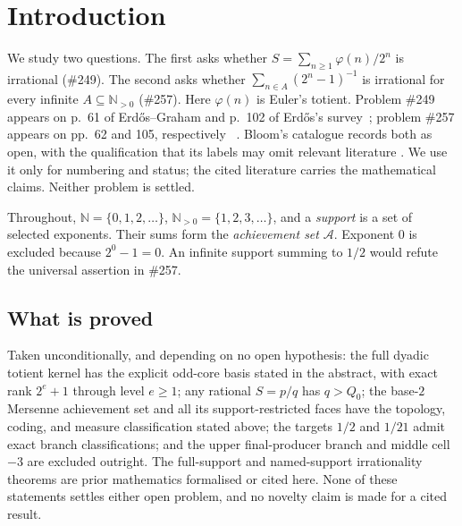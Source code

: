 \documentclass[11pt]{article}
\theoremstyle{definition}
\theoremstyle{remark}
\newcommand{\N}{\mathbb{N}}
\newcommand{\Npos}{\mathbb{N}_{>0}}
\newcommand{\ph}{\varphi}
\newcommand{\Qzero}{Q_0}
\begin{document}
\section{Introduction}\label{sec:intro}

We study two questions.  The first asks whether
$S=\sum_{n\ge1}\ph(n)/2^n$ is irrational (\#249).  The second asks whether
$\sum_{n\in A}(2^n-1)^{-1}$ is irrational
for every infinite $A\subseteq\Npos$ (\#257).
Here \(\ph(n)\) is Euler's totient.  Problem \#249
appears on p.~61 of Erd\H{o}s--Graham and p.~102 of Erd\H{o}s's
survey~\cite[p.~61]{erdosgraham1980}\cite[p.~102]{erdos1988}; problem
\#257 appears on pp.~62 and 105, respectively~\cite[p.~62]{erdosgraham1980}
\cite[p.~105]{erdos1988}.  Bloom's catalogue records both as open, with the
qualification that its labels may omit relevant literature
\cite{erdosproblems}.  We use it only for numbering and status; the
cited literature carries the mathematical claims.  Neither problem is settled.

Throughout, \(\N=\{0,1,2,\ldots\}\),
\(\Npos=\{1,2,3,\ldots\}\), and a \emph{support} is a set of selected
exponents.  Their sums form the \emph{achievement set} \(\mathcal A\).
Exponent \(0\) is excluded because \(2^0-1=0\).  An infinite support summing
to \(1/2\) would refute the universal assertion in \#257.

\subsection*{What is proved}

Taken unconditionally, and depending on no open hypothesis: the full dyadic
totient kernel has the explicit odd-core basis stated in the abstract, with
exact rank \(2^e+1\) through level \(e\ge1\); any rational \(S=p/q\) has
\(q>\Qzero\); the base-\(2\) Mersenne achievement set and all its
support-restricted faces have the topology, coding, and measure classification
stated above; the targets \(1/2\) and \(1/21\) admit exact branch
classifications; and the upper final-producer branch and middle cell \(-3\)
are excluded outright.  The full-support and named-support irrationality
theorems are prior mathematics formalised or cited here.  None of these
statements settles either open problem, and no novelty claim is made for a
cited result.
\end{document}
